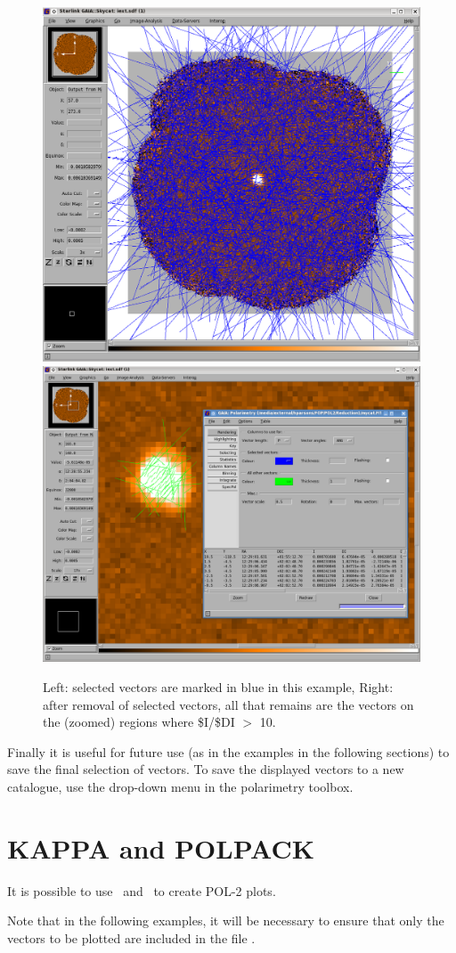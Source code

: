 \begin{figure}[t!]
\begin{center}
\includegraphics[width=0.44\linewidth]{sc22-gaia-plot-vectors-5.png}
\includegraphics[width=0.52\linewidth]{sc22-gaia-plot-vectors-7.png}
\caption [Over Plotting Vectors in GAIA]{ Left: selected vectors are
  marked in blue in this example, Right: after removal of selected
  vectors, all that remains are the vectors on the (zoomed) regions
  where \$I/\$DI $>$ 10.}
\label{fig:gaiavectorsfinal}
\end{center}
\end{figure}


Finally it is useful for future use (as in the examples in the
following sections) to save the final selection of vectors. To save the
displayed vectors to a new catalogue, use the drop-down menu
 in the polarimetry toolbox.

\section{KAPPA and POLPACK}

It is possible to use \Kappa\ and \polpack\ to create POL-2 plots.

\begin{terminalv}
\end{terminalv}

Note that in the following examples, it will be necessary to ensure
that only the vectors to be plotted are included in the file
.

